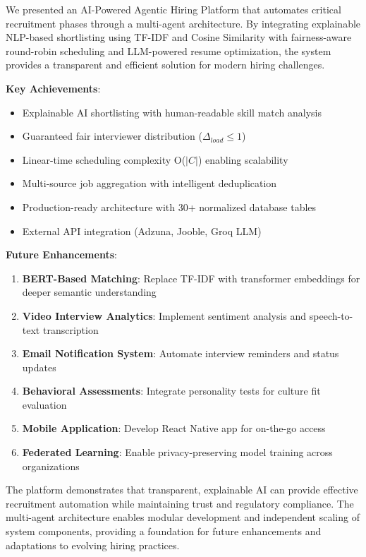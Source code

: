 \documentclass[conference]{IEEEtran}
\begin{document}
We presented an AI-Powered Agentic Hiring Platform that automates critical recruitment phases through a multi-agent architecture. By integrating explainable NLP-based shortlisting using TF-IDF and Cosine Similarity with fairness-aware round-robin scheduling and LLM-powered resume optimization, the system provides a transparent and efficient solution for modern hiring challenges.

\textbf{Key Achievements}:
\begin{itemize}
    \item Explainable AI shortlisting with human-readable skill match analysis
    \item Guaranteed fair interviewer distribution ($\Delta_{load} \leq 1$)
    \item Linear-time scheduling complexity O($|C|$) enabling scalability
    \item Multi-source job aggregation with intelligent deduplication
    \item Production-ready architecture with 30+ normalized database tables
    \item External API integration (Adzuna, Jooble, Groq LLM)
\end{itemize}

\textbf{Future Enhancements}:
\begin{enumerate}
    \item \textbf{BERT-Based Matching}: Replace TF-IDF with transformer embeddings for deeper semantic understanding
    \item \textbf{Video Interview Analytics}: Implement sentiment analysis and speech-to-text transcription
    \item \textbf{Email Notification System}: Automate interview reminders and status updates
    \item \textbf{Behavioral Assessments}: Integrate personality tests for culture fit evaluation
    \item \textbf{Mobile Application}: Develop React Native app for on-the-go access
    \item \textbf{Federated Learning}: Enable privacy-preserving model training across organizations
\end{enumerate}

The platform demonstrates that transparent, explainable AI can provide effective recruitment automation while maintaining trust and regulatory compliance. The multi-agent architecture enables modular development and independent scaling of system components, providing a foundation for future enhancements and adaptations to evolving hiring practices.
\end{document}
